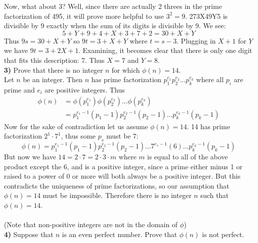 \documentclass{scrartcl}
\begin{document}
Now, what about 3? Well, since there are actually 2 threes in the prime factorization of 495, it will prove more helpful to use $3^2=9$. 273X49Y5 is divisible by 9 exactly when the sum of its digits is divisible by 9. We see:
$$ 5 + Y + 9 + 4 + X + 3 + 7 + 2 = 30 + X + Y $$
Thus $9s = 30 + X + Y$ so $9t = 3 + X + Y$ where $t=s-3$. Plugging in $X+1$ for $Y$ we have $9t = 3 + 2X + 1$. Examining, it becomes clear that there is only one digit that fits this description: 7. Thus $X=7$ and $Y=8$.\\


\textbf{3)} Prove that there is no integer $n$ for which $\phi(n) = 14$.\\

Let $n$ be an integer. Then $n$ has prime factorization $p_1^{e_1}p_2^{e_2} ... p_k^{e_k}$ where all $p_i$ are prime and $e_i$ are positive integers. Thus
\begin{align*}
  \phi(n) &= \phi\left(p_1^{e_1}\right)\phi\left(p_2^{e_2}\right)...\phi\left(p_k^{e_k}\right)\\
  &= p_1^{e_1-1}\left(p_1-1\right)p_2^{e_2-1}\left(p_2-1\right)...p_k^{e_k-1}\left(p_k-1\right)
\end{align*}
Now for the sake of contradiction let us assume $\phi(n)=14$. 14 has prime factorization $2^1\cdot7^1$, thus some $p_s$ must be 7:
$$\phi(n) = p_1^{e_1-1}\left(p_1-1\right)p_2^{e_2-1}\left(p_2-1\right)...7^{e_s-1}\left(6\right)...p_k^{e_k-1}\left(p_k-1\right)$$
But now we have $14 = 2\cdot7 = 2\cdot3\cdot m$ where $m$ is equal to all of the above product except the 6, and is a positive integer, since a prime either minus 1 or raised to a power of 0 or more will both always be a positive integer. But this contradicts the uniqueness of prime factorizations, so our assumption that $\phi(n)=14$ must be impossible. Therefore there is no integer $n$ such that $\phi(n)=14$.\\\ \\
(Note that non-positive integers are not in the domain of $\phi$)\\

\textbf{4)} Suppose that $n$ is an even perfect number. Prove that $\phi(n)$ is not perfect.\\
\end{document}
